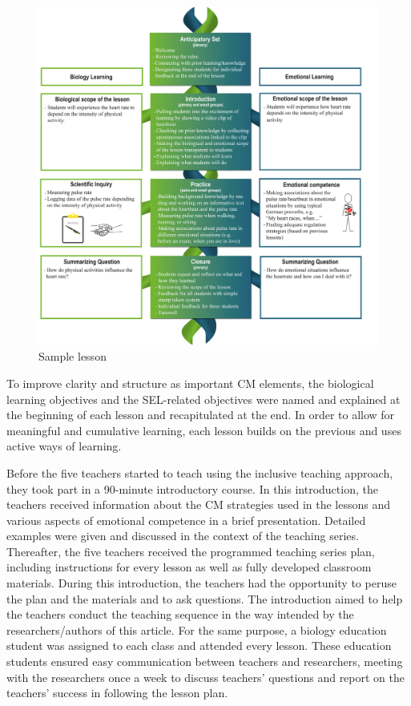 \documentclass[11.5pt]{sig-alternate} %
\begin{document}
\begin{large}
\begin{figure}[!h]
    \includegraphics[width=1\textwidth]{images/fig2.png}
    \caption{Sample lesson}
\end{figure}

To improve clarity and structure as important CM elements, the biological learning objectives and the SEL-related objectives were named and explained at the beginning of each lesson and recapitulated at the end. In order to allow for meaningful and cumulative learning, each lesson builds on the previous and uses active ways of learning.

Before the five teachers started to teach using the inclusive teaching approach, they took part in a 90-minute introductory course. In this introduction, the teachers received information about the CM strategies used in the lessons and various aspects of emotional competence in a brief presentation. Detailed examples were given and discussed in the context of the teaching series. Thereafter, the five teachers received the programmed teaching series plan, including instructions for every lesson as well as fully developed classroom materials. During this introduction, the teachers had the opportunity to peruse the plan and the materials and to ask questions. The introduction aimed to help the teachers conduct the teaching sequence in the way intended by the researchers/authors of this article. For the same purpose, a biology education student was assigned to each class and attended every lesson. These education students ensured easy communication between teachers and researchers, meeting with the researchers once a week to discuss teachers’ questions and report on the teachers’ success in following the lesson plan.


\end{large}
\end{document}
